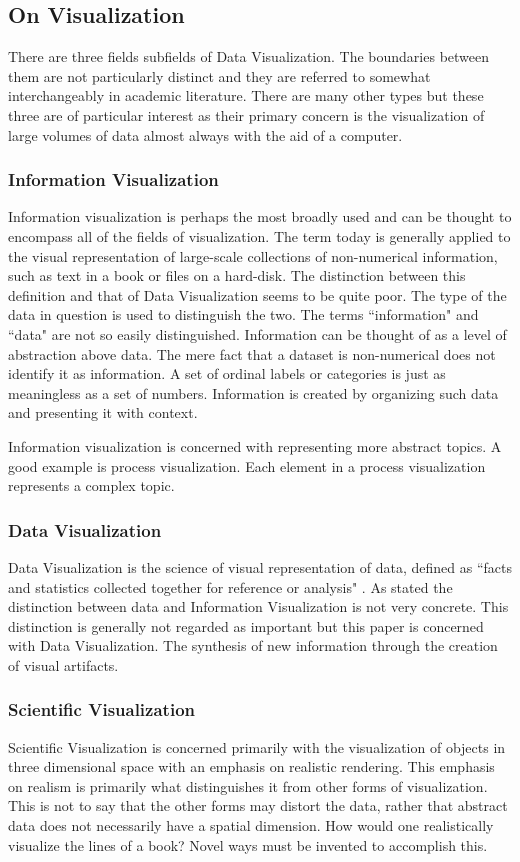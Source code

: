 \documentclass[a4paper, 11pt, titlepage, onehalfspacing]{article}
\begin{document}
\subsection{On Visualization}
There are three fields subfields of Data Visualization. The boundaries between them are not particularly distinct and they are referred to somewhat interchangeably in academic literature. There are many other types but these three are of particular interest as their primary concern is the visualization of large volumes of data almost always with the aid of a computer.
\subsubsection{Information Visualization}
Information visualization is perhaps the most broadly used and can be thought to encompass all of the fields of visualization. The term today is generally applied to the visual representation of large-scale collections of non-numerical information, such as text in a book or files on a hard-disk. The distinction between this definition and that of Data Visualization seems to be quite poor. The type of the data in question is used to distinguish the two. The terms ``information" and ``data" are not so easily distinguished. Information can be thought of as a level of abstraction above data. The mere fact that a dataset is non-numerical does not identify it as information. A set of ordinal labels or categories is just as meaningless as a set of numbers. Information is created by organizing such data and presenting it with context.

Information visualization is concerned with representing more abstract topics. A good example is process visualization. Each element in a process visualization represents a complex topic.

\subsubsection{Data Visualization}
Data Visualization is the science of visual representation of data, defined as ``facts and statistics collected together for reference or analysis" \cite{oed31}. As stated the distinction between data and Information Visualization is not very concrete. This distinction is generally not regarded as important but this paper is concerned with Data Visualization. The synthesis of new information through the creation of visual artifacts.

\subsubsection{Scientific Visualization}
Scientific Visualization is concerned primarily with the visualization of objects in three dimensional space with an emphasis on realistic rendering. This emphasis on realism is primarily what distinguishes it from other forms of visualization. This is not to say that the other forms may distort the data, rather that abstract data does not necessarily have a spatial dimension. How would one realistically visualize the lines of a book? Novel ways must be invented to accomplish this.
\end{document}
